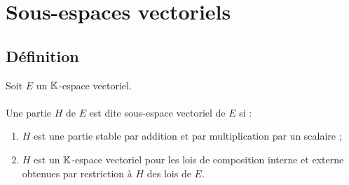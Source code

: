 \section{Sous-espaces vectoriels}
\subsection{Définition}
\begin{defprop}
    Soit \(E\) un \(\mathbb{K}\)-espace vectoriel.\\~\\
    Une partie \(H\) de \(E\) est dite sous-espace vectoriel de \(E\) si :
    \begin{enumerate}
        \item \(H\) est une partie stable par addition et par multiplication par un scalaire ;
        \item \(H\) est un \(\mathbb{K}\)-espace vectoriel pour les lois de composition interne et externe obtenues par restriction à \(H\) des lois de \(E\).
    \end{enumerate}
\end{defprop}

